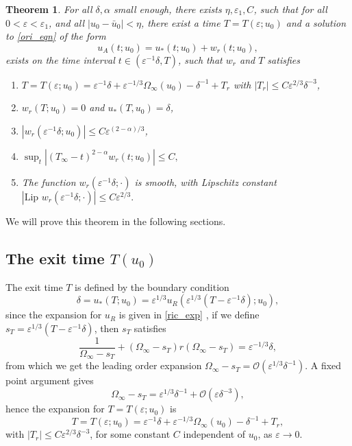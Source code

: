 \documentclass[letterpaper,11pt]{article}
\newcommand{\rmO}{\mathcal{O}}
\newcommand{\eps}{\varepsilon}
\numberwithin{equation}{section}
\theoremstyle{plain}
\newtheorem{theorem}{Theorem}[section]
\begin{document}
\begin{theorem}\label{thm_r}
For all $\delta, \alpha$ small enough, there exists $\eta,\eps_1,C$, such that for all $0<\eps <\eps_1$, and all $|u_0 - \bar{u}_0|<\eta$, there exist a time $T=T(\eps;u_0)$ and a solution to \eqref{ori_eqn} of the form
\[
u_A(t;u_0) = u_*(t; u_0) + w_r(t; u_0),
\]
exists on the time interval $t \in (\eps^{-1}\delta, T)$, such that $w_r$ and $T$ satisfies
\begin{enumerate}[label=\textnormal{(\arabic*)}]
\item \label{thm_r_1}$T=T(\eps;u_0) = \eps^{-1}\delta+\eps^{-1/3}\Omega_\infty(u_0)-\delta^{-1}+T_r$ with $|T_r|\le C\eps^{2/3}\delta^{-3}$,
\item \label{thm_r_2} $w_r(T; u_0) = 0$ and $u_*(T,u_0)=\delta$,
\item \label{thm_r_3} $|w_r(\eps^{-1}\delta; u_0)| \le C\eps^{(2-\alpha)/3}$,

\item \label{thm_r_4} $\sup_{t} |(T_\infty-t)^{2-\alpha} w_r(t; u_0)| \le C,$

\item \label{thm_r_5} The function $w_r(\eps^{-1}\delta; \cdot)$ is smooth, with Lipschitz constant  $|\text{Lip }w_r(\eps^{-1}\delta; \cdot) |\le C\eps^{2/3} . $

\end{enumerate}

\end{theorem}

We will prove this theorem in the following sections.
\subsection{The exit time \texorpdfstring{$T(u_0)$}{T(u_0)}}\label{exit_time}
The exit time $T$ is defined by the boundary condition 
\[
\delta = u_*(T; u_0) = \eps^{1/3}u_R(\eps^{1/3}(T-\eps^{-1}\delta); u_0),
\]
since the expansion for $u_R$ is given in \eqref{ric_exp} , if we define $s_T = \eps^{1/3}(T-\eps^{-1}\delta)$, then $s_T$ satisfies
\[
\frac{1}{\Omega_\infty-s_T} + (\Omega_\infty-s_T)r(\Omega_\infty-s_T) = \eps^{-1/3}\delta,
\]
from which we get the leading order expansion $\Omega_\infty-s_T = \rmO(\eps^{1/3}\delta^{-1})$. A fixed point argument gives
\[
\Omega_\infty - s_T = \eps^{1/3}\delta^{-1} + \rmO(\eps \delta^{-3}),
\]
hence the expansion for $T=T(\eps; u_0)$ is
\begin{equation}\label{T_exp}
T = T(\eps;u_0) = \eps^{-1}\delta + \eps^{-1/3}\Omega_\infty(u_0) - \delta^{-1} + T_r,
\end{equation}
with 
$|T_r|\le C\eps^{2/3}\delta^{-3}$, for some constant $C$ independent of $u_0$, as $\eps \to 0$.
\end{document}

